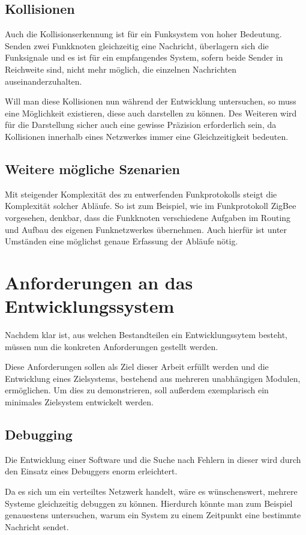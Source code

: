\subsection{Kollisionen}\label{subs:kollision}
Auch die Kollisionserkennung ist für ein Funksystem von hoher Bedeutung. Senden
zwei Funkknoten gleichzeitig eine Nachricht, überlagern sich die Funksignale und
es ist für ein empfangendes System, sofern beide Sender in Reichweite sind,
nicht mehr möglich, die einzelnen Nachrichten auseinanderzuhalten.

Will man diese Kollisionen nun während der Entwicklung untersuchen, so muss eine
Möglichkeit existieren, diese auch darstellen zu können. Des Weiteren wird
für die Darstellung sicher auch eine gewisse Präzision erforderlich sein, da
Kollisionen innerhalb eines Netzwerkes immer eine Gleichzeitigkeit bedeuten.
\subsection{Weitere mögliche Szenarien}
Mit steigender Komplexität des zu entwerfenden Funkprotokolls steigt die
Komplexität solcher Abläufe. So ist zum Beispiel, wie im Funkprotokoll ZigBee
vorgesehen\cite{ZIGB}, denkbar, dass die Funkknoten verschiedene Aufgaben im
Routing und Aufbau des eigenen Funknetzwerkes übernehmen. Auch hierfür ist unter
Umständen eine möglichst genaue Erfassung der Abläufe nötig.
\section{Anforderungen an das Entwicklungssystem}
Nachdem klar ist, aus welchen Bestandteilen ein Entwicklungssytem besteht,
müssen nun die konkreten Anforderungen gestellt werden.

Diese Anforderungen sollen als Ziel dieser Arbeit erfüllt werden und die
Entwicklung eines Zielsystems, bestehend aus mehreren unabhängigen
Modulen, ermöglichen. Um dies zu demonstrieren, soll außerdem exemplarisch ein
minimales Zielsystem entwickelt werden.

\subsection{Debugging} Die Entwicklung einer Software und die Suche nach Fehlern
in dieser wird durch den Einsatz eines Debuggers enorm erleichtert.

Da es sich um ein verteiltes Netzwerk handelt, wäre es wünschenswert, mehrere
Systeme gleichzeitig debuggen zu können. Hierdurch könnte man zum Beispiel
genauestens untersuchen, warum ein System zu einem Zeitpunkt eine bestimmte
Nachricht sendet.

